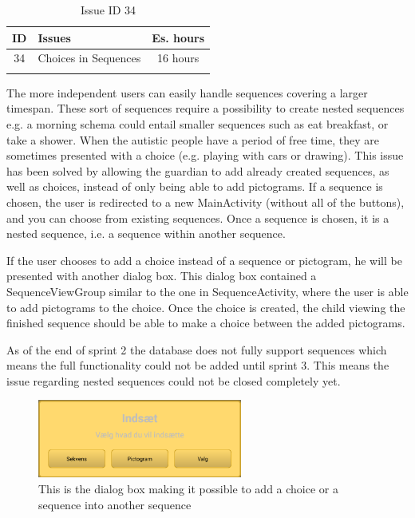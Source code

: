\clearpage
\begin{longtable} { | c | p{12cm} | c | } 
\hline
	ID 	&	Issues	&		 Es. hours \\\hline
	34 	&	Choices in Sequences		&	16 hours \\\hline
\caption{Issue ID 34}
\label{tab:spr2_nested}
\end{longtable}

The more independent users can easily handle sequences covering a larger timespan. These sort of sequences require a possibility to create nested sequences e.g. a morning schema could entail smaller sequences such as eat breakfast, or take a shower. When the autistic people have a period of free time, they are sometimes presented with a choice (e.g. playing with cars or drawing).
This issue has been solved by allowing the guardian to add already created sequences, as well as choices, instead of only being able to add pictograms. If a sequence is chosen, the user is redirected to a new MainActivity (without all of the buttons), and you can choose from existing sequences. Once a sequence is chosen, it is a nested sequence, i.e. a sequence within another sequence. 

If the user chooses to add a choice instead of a sequence or pictogram, he will be presented with another dialog box. This dialog box contained a SequenceViewGroup similar to the one in SequenceActivity, where the user is able to add pictograms to the choice. Once the choice is created, the child viewing the finished sequence should be able to make a choice between the added pictograms.

As of the end of sprint 2 the database does not fully support sequences which means the full functionality could not be added until sprint 3. This means the issue regarding nested sequences could not be closed completely yet.

\begin{figure} [h!]
\centering
\includegraphics[width=0.6\textwidth]{Pics/Sprint2/dialogs/magicAdd.png}
\caption{This is the dialog box making it possible to add a choice or a sequence into another sequence}
\label{fig:addDialog}
\end{figure}




